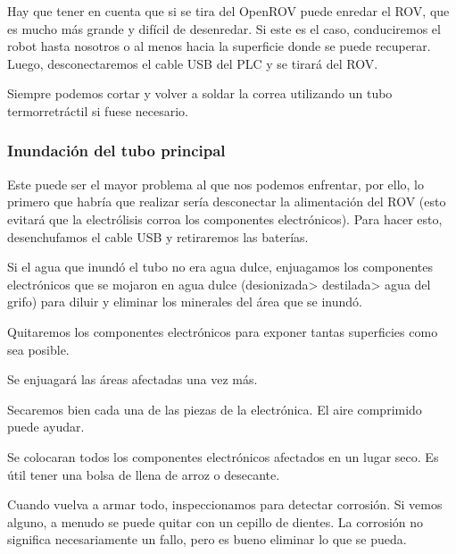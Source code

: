 Hay que tener en cuenta que si se tira del OpenROV puede enredar el ROV, que es mucho más grande y difícil de desenredar. Si este es el caso, conduciremos el robot hasta nosotros o al menos hacia la superficie donde se puede recuperar. Luego, desconectaremos el cable USB del PLC y se tirará del ROV.

Siempre podemos cortar y volver a soldar la correa utilizando un tubo termorretráctil si fuese necesario.

\subsubsection{Inundación del tubo principal}
\label{subsubsec:inundacion_tubo}
Este puede ser el mayor problema al que nos podemos enfrentar, por ello, lo primero que habría que realizar sería desconectar la alimentación del ROV (esto evitará que la electrólisis corroa los componentes electrónicos). Para hacer esto, desenchufamos el cable USB y retiraremos las baterías.

Si el agua que inundó el tubo no era agua dulce, enjuagamos los componentes electrónicos que se mojaron en agua dulce (desionizada> destilada> agua del grifo) para diluir y eliminar los minerales del área que se inundó.

Quitaremos los componentes electrónicos para exponer tantas superficies como sea posible.

Se enjuagará las áreas afectadas una vez más.

Secaremos bien cada una de las piezas de la electrónica. El aire comprimido puede ayudar.

Se colocaran todos los componentes electrónicos afectados en un lugar seco. Es útil tener una bolsa de llena de arroz o desecante.

Cuando vuelva a armar todo, inspeccionamos para detectar corrosión. Si vemos alguno, a menudo se puede quitar con un cepillo de dientes. La corrosión no significa necesariamente un fallo, pero es bueno eliminar lo que se pueda.